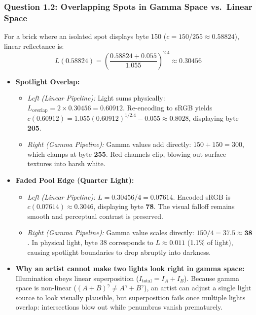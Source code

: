 \documentclass[10pt,a4paper]{article}
\begin{document}
\subsubsection*{Question 1.2: Overlapping Spots in Gamma Space vs.\ Linear Space}
For a brick where an isolated spot displays byte 150 ($c = 150/255 \approx 0.58824$), linear reflectance is:
\[
L(0.58824) = \left(\frac{0.58824 + 0.055}{1.055}\right)^{2.4} \approx 0.30456
\]
\begin{itemize}
    \item \textbf{Spotlight Overlap:}
    \begin{itemize}
        \item \emph{Left (Linear Pipeline):} Light sums physically: $L_{\text{overlap}} = 2 \times 0.30456 = 0.60912$. Re-encoding to sRGB yields $c(0.60912) = 1.055(0.60912)^{1/2.4} - 0.055 \approx 0.8028$, displaying byte \textbf{205}.
        \item \emph{Right (Gamma Pipeline):} Gamma values add directly: $150 + 150 = 300$, which clamps at byte \textbf{255}. Red channels clip, blowing out surface textures into harsh white.
    \end{itemize}
    \item \textbf{Faded Pool Edge (Quarter Light):}
    \begin{itemize}
        \item \emph{Left (Linear Pipeline):} $L = 0.30456 / 4 = 0.07614$. Encoded sRGB is $c(0.07614) \approx 0.3046$, displaying byte \textbf{78}. The visual falloff remains smooth and perceptual contrast is preserved.
        \item \emph{Right (Gamma Pipeline):} Gamma value scales directly: $150 / 4 = 37.5 \approx \mathbf{38}$. In physical light, byte 38 corresponds to $L \approx 0.011$ (1.1\% of light), causing spotlight boundaries to drop abruptly into darkness.
    \end{itemize}
    \item \textbf{Why an artist cannot make two lights look right in gamma space:}
    Illumination obeys linear superposition ($I_{\text{total}} = I_A + I_B$). Because gamma space is non-linear ($(A + B)^\gamma \ne A^\gamma + B^\gamma$), an artist can adjust a single light source to look visually plausible, but superposition fails once multiple lights overlap: intersections blow out while penumbras vanish prematurely.
\end{itemize}
\end{document}
